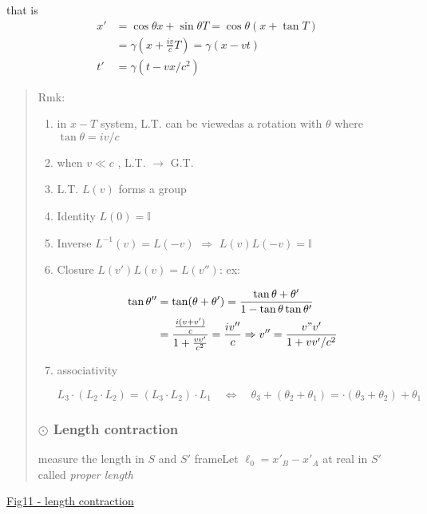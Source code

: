 \documentclass[12pt]{article}
\begin{document}
that is 
\begin{equation}
\begin{aligned}
x'
&= \cos\theta x + \sin \theta T = \cos\theta (x+\tan T)\\
&= \gamma \left(x + \frac{iv}{c}T\right) = \gamma (x-vt)\\
t' &= \gamma (t - vx/c^2)
\end{aligned}
\end{equation}


\begin{quote}
	Rmk:
\begin{enumerate}
	\item in $x-T$ system, L.T. can be viewedas a rotation with $\theta$ where $\tan\theta = iv/c$

	\item when $v\ll c$ , L.T. $\to$ G.T.

	\item L.T. $L( v )$ forms a group
	\item Identity $L(0) = \mathbb{I}$

	\item Inverse $L^{-1}(v) = L(-v)$ $\Rightarrow$ $L(v) L(-v) = \mathbb{I}$

	\item Closure $L(v')L(v) = L(v'')$: ex:

\begin{equation}
\begin{aligned}
\tan\theta'' &= \tan(\theta+\theta') = \frac{\tan\theta + \theta'}{1- \tan\theta \tan\theta'}\\
&= \frac{\frac{i(v+v')}{c}}{1+\frac{vv'}{c^2}} = \frac{iv''}{c}
\Rightarrow v'' = \frac{v" v'}{1+vv'/c^2}
\end{aligned}
\end{equation}

	\item associativity

\begin{equation}
L_3\cdot (L_2\cdot L_2) = (L_3\cdot L_2)\cdot L_1
\quad\Leftrightarrow\quad
\theta_3 + (\theta_2 + \theta_1) = \cdot (\theta_3 + \theta_2) + \theta_1
\end{equation}

\end{enumerate}
\subsubsection{$\odot$ Length contraction} %
measure the length in $S$ and $S'$ frameLet $\ell_0 = x'_B - x'_A$ at real in $S'$ called \textit{proper length}

\end{quote}
\underline{Fig11 - length contraction}
\end{document}
